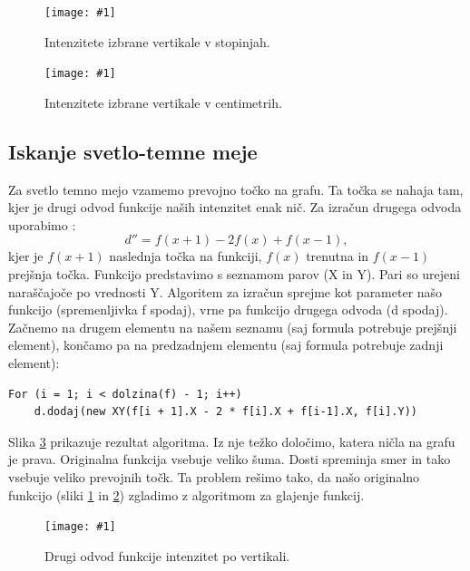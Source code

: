 \documentclass[oneside, a4paper, 12pt]{book}
\newcommand{\slika}[3]{
	\begin{figure}
	\begin{center}
	\texttt{[image: \#1]}
	\end{center}
	\vspace{-20pt}
	\caption{#2}
	\label{#3}
	\end{figure}
}
\begin{document}
\slika{slike/intenzitete.jpg}{Intenzitete izbrane vertikale v 
stopinjah.}{pic:intenzitete1}

\slika{slike/intenzitete-v-cm.jpg}{Intenzitete izbrane vertikale v 
centimetrih.}{pic:intenzitete2}

\subsection{Iskanje svetlo-temne meje}
\begin{samepage}
Za svetlo temno mejo vzamemo prevojno točko na grafu. Ta točka se nahaja 
tam, kjer je drugi odvod funkcije naših intenzitet enak nič. Za izračun 
drugega odvoda uporabimo \cite{second-d}:
\begin{equation}
d''=f(x+1) - 2f(x) + f(x-1),
\end{equation}
kjer je $f(x+1)$ naslednja točka na funkciji, $f(x)$ trenutna in $f(x-1)$ 
prejšnja točka. Funkcijo predstavimo s seznamom parov (X in Y). Pari so 
urejeni naraščajoče po vrednosti Y. Algoritem za izračun sprejme kot 
parameter našo funkcijo (spremenljivka f spodaj), vrne pa funkcijo drugega 
odvoda (d spodaj). Začnemo na drugem elementu na našem seznamu (saj 
formula potrebuje prejšnji element), končamo pa na predzadnjem elementu 
(saj formula potrebuje zadnji element):
\begin{verbatim}
For (i = 1; i < dolzina(f) - 1; i++) 
    d.dodaj(new XY(f[i + 1].X - 2 * f[i].X + f[i-1].X, f[i].Y))
\end{verbatim}
\end{samepage}

Slika \ref{pic:d2} prikazuje rezultat algoritma. Iz nje težko določimo, 
katera ničla na grafu je prava. Originalna funkcija vsebuje veliko šuma. 
Dosti spreminja smer in tako vsebuje veliko prevojnih točk. Ta problem 
rešimo tako, da našo originalno funkcijo (sliki \ref{pic:intenzitete1} 
in \ref{pic:intenzitete2}) zgladimo z algoritmom za glajenje funkcij.

\slika{slike/drugi-odvod-1.jpg}{Drugi odvod funkcije intenzitet po 
vertikali.}{pic:d2}
\end{document}
